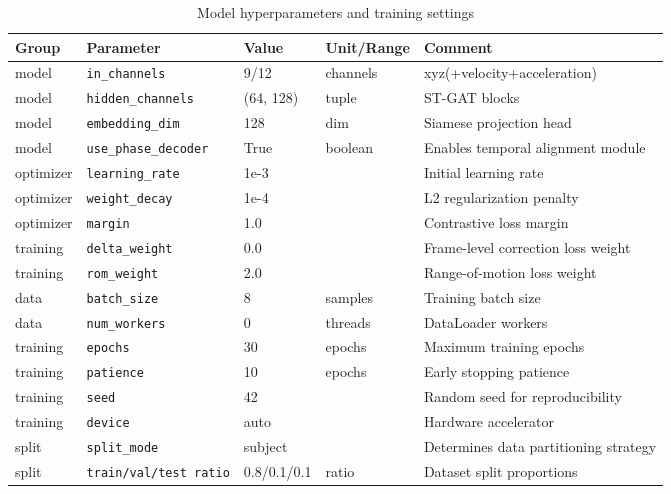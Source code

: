 \begin{table}[H]
\centering
\small
\begin{tabular}{|p{1.5cm}|p{3.5cm}|p{2.0cm}|p{2.0cm}|p{5.0cm}|}
\hline
\textbf{Group} & \textbf{Parameter} & \textbf{Value} & \textbf{Unit/Range} & \textbf{Comment} \\ \hline
model & \texttt{in\_channels} & 9/12 & channels & xyz(+velocity+acceleration) \\ \hline
model & \texttt{hidden\_channels} & (64, 128) & tuple & ST-GAT blocks \\ \hline
model & \texttt{embedding\_dim} & 128 & dim & Siamese projection head \\ \hline
model & \texttt{use\_phase\_decoder} & True & boolean & Enables temporal alignment module \\ \hline
optimizer & \texttt{learning\_rate} & 1e-3 & & Initial learning rate \\ \hline
optimizer & \texttt{weight\_decay} & 1e-4 & & L2 regularization penalty \\ \hline
optimizer & \texttt{margin} & 1.0 & & Contrastive loss margin \\ \hline
training & \texttt{delta\_weight} & 0.0 & & Frame-level correction loss weight \\ \hline
training & \texttt{rom\_weight} & 2.0 & & Range-of-motion loss weight \\ \hline
data & \texttt{batch\_size} & 8 & samples & Training batch size \\ \hline
data & \texttt{num\_workers} & 0 & threads & DataLoader workers \\ \hline
training & \texttt{epochs} & 30 & epochs & Maximum training epochs \\ \hline
training & \texttt{patience} & 10 & epochs & Early stopping patience \\ \hline
training & \texttt{seed} & 42 & & Random seed for reproducibility \\ \hline
training & \texttt{device} & auto & & Hardware accelerator \\ \hline
split & \texttt{split\_mode} & subject & & Determines data partitioning strategy \\ \hline
split & \texttt{train/val/test ratio} & 0.8/0.1/0.1 & ratio & Dataset split proportions \\ \hline
\end{tabular}
\caption{Model hyperparameters and training settings}
\label{tab:T3}
\end{table}